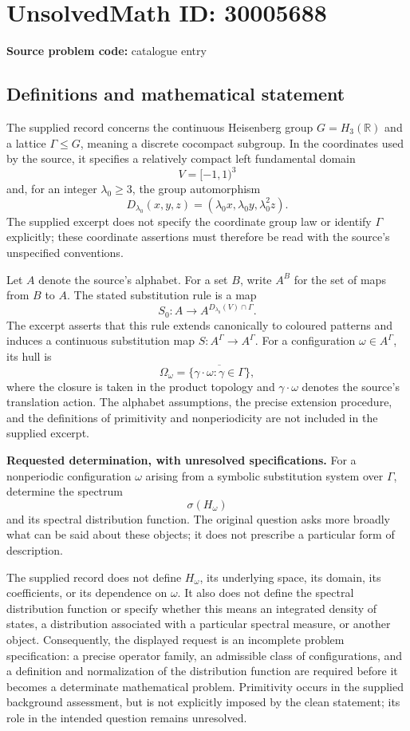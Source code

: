 \documentclass[11pt]{article}
\newcommand{\R}{\mathbb{R}}
\begin{document}
\section*{UnsolvedMath ID: 30005688}
\textbf{Source problem code:} catalogue entry
\subsection{Definitions and mathematical statement}
The supplied record concerns the continuous Heisenberg group \(G=H_3(\R)\) and a lattice \(\Gamma\leq G\), meaning a discrete cocompact subgroup. In the coordinates used by the source, it specifies a relatively compact left fundamental domain
\[
V=[-1,1)^3
\]
and, for an integer \(\lambda_0\geq 3\), the group automorphism
\[
D_{\lambda_0}(x,y,z)=(\lambda_0x,\lambda_0y,\lambda_0^2z).
\]
The supplied excerpt does not specify the coordinate group law or identify \(\Gamma\) explicitly; these coordinate assertions must therefore be read with the source's unspecified conventions.

Let \(A\) denote the source's alphabet. For a set \(B\), write \(A^B\) for the set of maps from \(B\) to \(A\). The stated substitution rule is a map
\[
S_0:A\longrightarrow A^{D_{\lambda_0}(V)\cap\Gamma}.
\]
The excerpt asserts that this rule extends canonically to coloured patterns and induces a continuous substitution map \(S:A^\Gamma\to A^\Gamma\). For a configuration \(\omega\in A^\Gamma\), its hull is
\[
\Omega_\omega=\overline{\{\gamma\cdot\omega:\gamma\in\Gamma\}},
\]
where the closure is taken in the product topology and \(\gamma\cdot\omega\) denotes the source's translation action. The alphabet assumptions, the precise extension procedure, and the definitions of primitivity and nonperiodicity are not included in the supplied excerpt.

\textbf{Requested determination, with unresolved specifications.} For a nonperiodic configuration \(\omega\) arising from a symbolic substitution system over \(\Gamma\), determine the spectrum
\[
\sigma(H_\omega)
\]
and its spectral distribution function. The original question asks more broadly what can be said about these objects; it does not prescribe a particular form of description.

The supplied record does not define \(H_\omega\), its underlying space, its domain, its coefficients, or its dependence on \(\omega\). It also does not define the spectral distribution function or specify whether this means an integrated density of states, a distribution associated with a particular spectral measure, or another object. Consequently, the displayed request is an incomplete problem specification: a precise operator family, an admissible class of configurations, and a definition and normalization of the distribution function are required before it becomes a determinate mathematical problem. Primitivity occurs in the supplied background assessment, but is not explicitly imposed by the clean statement; its role in the intended question remains unresolved.
\end{document}
